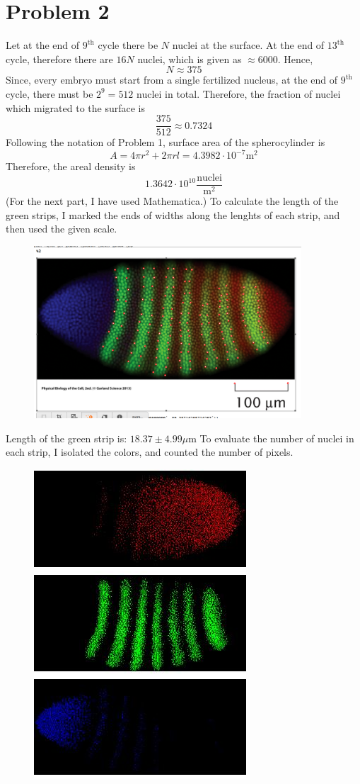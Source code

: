 \documentclass[a4paper]{article}
\begin{document}
\section{Problem 2}
    Let at the end of $9^{\text{th}}$ cycle there be $N$ nuclei at the surface. At the end of $13^{\text{th}}$ cycle, therefore there are $16N$ nuclei, which is given as $\approx 6000$. Hence, $$N \approx 375$$
    Since, every embryo must start from a single fertilized nucleus, at the end of $9^{\text{th}}$ cycle, there must be $2^{9} = 512$ nuclei in total. Therefore, the fraction of nuclei which migrated to the surface is$$\frac{375}{512} \approx 0.7324$$
    Following the notation of Problem 1, surface area of the spherocylinder is $$A=4\pi r^{2} + 2\pi r l = 4.3982\cdot 10^{-7} \text{m}^{2}$$ 
    Therefore, the areal density is $$1.3642\cdot10^{10} \frac{\text{nuclei}}{\text{m}^2}$$
    (For the next part, I have used Mathematica.)
    To calculate the length of the green strips, I marked the ends of widths along the lenghts of each strip, and then used the given scale.
    \begin{figure}
    \includegraphics[width=10cm]{q2_length.png}
    \centering 
\end{figure} \newline
    Length of the green strip is: $18.37 \pm 4.99 \mu \text{m}$
    To evaluate the number of nuclei in each strip, I isolated the colors, and counted the number of pixels.
    \begin{figure}
        \includegraphics{q2_count.jpeg}
    \centering 
\end{figure} \newline
\end{document}

